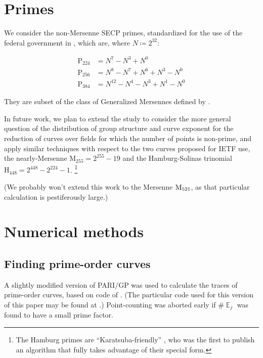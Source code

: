 \documentclass[11pt,fleqn]{article}
\newcommand{\Pa}{\ensuremath{\mathup{P}_{224}} }
\newcommand{\Pb}{\ensuremath{\mathup{P}_{256}} }
\newcommand{\Pc}{\ensuremath{\mathup{P}_{384}} }
\newcommand{\Pd}{\ensuremath{\mathup{M}_{255}} }
\newcommand{\Pg}{\ensuremath{\mathup{H}_{448}} }
\newcommand{\Ej}{\ensuremath{\BbbE_j} }
\begin{document}
\section{Primes}

We consider the non-Mersenne SECP primes, standardized for the use of the
federal government in \cite{recur}, which are, where $N \coloneqq 2^{32}$:

\begin{equation}
\begin{aligned}
    \Pa &= N^7 - N^3 + N^0                \\
    \Pb &= N^8 - N^7 + N^6 + N^3 - N^0    \\
    \Pc &= N^{12} - N^4 - N^3 + N^1 - N^0
\end{aligned}
\end{equation}

They are subset of the class of Generalized Mersennes defined by
\autocite{Solinas}.


In future work, we plan to extend the study to consider the more general question
of the distribution of group structure and curve exponent for the reduction of
curves over fields for which the number of points is non-prime, and apply similar
techniques with respect to the two curves proposed for IETF use, the nearly-Mersenne
$\Pd = 2^{255}-19$ and the Hamburg-Solinas trinomial $\Pg = 2^{448}-2^{224}-1$.
\footnote{The Hamburg primes are ``Karatsuba-friendly'' \cite{Hamburg}, who was the
first to publish an algorithm that fully takes advantage of their special form.}

(We probably won't extend this work to the Mersenne $\textup{M}_{521}$, as that
particular calculation is pestiferously large.)

\section{Numerical methods}

\subsection{Finding prime-order curves}

A slightly modified version of PARI/GP was used to calculate the
traces of prime-order curves, based on code of \cite{Hamburg}.
(The particular code used for this version of this paper may be
found at \autocite{junkpari}.) Point-counting was aborted early
if $\#\Ej$ was found to have a small prime factor.
\end{document}
